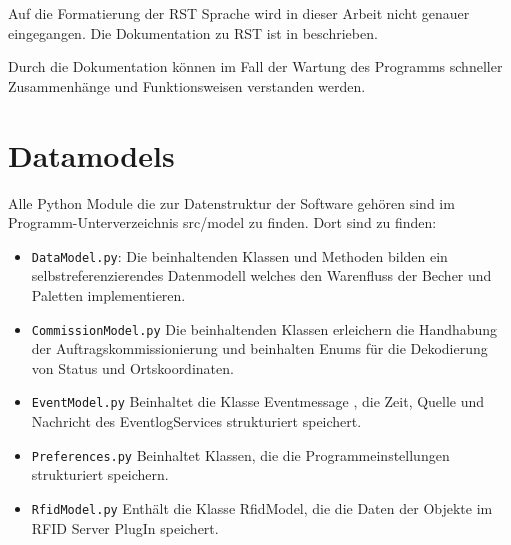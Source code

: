 Auf die Formatierung der RST Sprache wird in dieser Arbeit nicht genauer eingegangen. Die Dokumentation zu RST ist in \cite{sphinxRST} beschrieben.

Durch die Dokumentation können im Fall der Wartung des Programms schneller Zusammenhänge und Funktionsweisen verstanden werden. 


\section*{Datamodels}
Alle Python Module die zur Datenstruktur der Software gehören sind im Programm-Unterverzeichnis \glqq src/model \grqq zu finden. 
Dort sind zu finden: 
\begin{itemize}
    \item \verb|DataModel.py|: Die beinhaltenden Klassen und Methoden bilden ein selbstreferenzierendes Datenmodell welches den \glq Warenfluss \grq der Becher und Paletten implementieren.
    \item \verb|CommissionModel.py| Die beinhaltenden Klassen erleichern die Handhabung der Auftragskommissionierung und beinhalten Enums für die Dekodierung von Status und Ortskoordinaten. 
    \item \verb|EventModel.py| Beinhaltet die Klasse \glqq Eventmessage \grqq , die Zeit, Quelle und Nachricht des EventlogServices strukturiert speichert.
    \item \verb|Preferences.py| Beinhaltet Klassen, die die Programmeinstellungen strukturiert speichern. 
    \item \verb|RfidModel.py| Enthält die Klasse RfidModel, die die Daten der Objekte im RFID Server PlugIn speichert.
\end{itemize}
